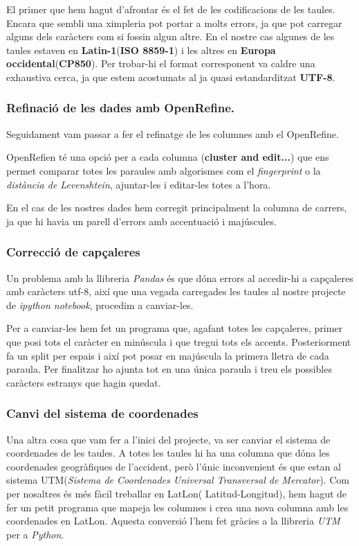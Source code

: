 El primer que hem hagut d'afrontar és el fet de les codificacions de les taules. Encara que sembli una ximpleria pot portar a molts errors, ja que pot carregar alguns dels caràcters com si fossin algun altre. En el nostre cas algunes de les taules estaven en \textbf{Latin-1}(\textbf{ISO 8859-1}) i les altres en \textbf{Europa occidental}(\textbf{CP850}). Per trobar-hi el format corresponent va caldre una exhaustiva cerca, ja que estem acostumats al ja quasi estandarditzat \textbf{ UTF-8}.

\subsubsection*{Refinació de les dades amb OpenRefine.}
Seguidament vam passar a fer el refinatge de les columnes amb el OpenRefine.

OpenRefien té una opció per a cada columna (\textbf{cluster and edit...}) que ens permet comparar totes les paraules amb algorismes com el \textit{fingerprint } o la \textit{distància de Levenshtein}, ajuntar-les i editar-les totes a l'hora.

En el cas de les nostres dades hem corregit principalment la columna de carrers, ja que hi havia un parell d'errors amb accentuació i majúscules.
\subsubsection*{Correcció de capçaleres}
Un problema amb la llibreria \textit{Pandas} és que dóna errors al accedir-hi a capçaleres amb caràcters utf-8, així que una vegada carregades les taules al nostre projecte de \textit{ipython notebook}, procedim a canviar-les.

Per a canviar-les hem fet un programa que, agafant totes les capçaleres, primer que posi tots el caràcter en minúscula i que tregui tots els accents. Posteriorment fa un split per espais i així pot posar en majúscula la primera lletra de cada paraula. Per finalitzar ho ajunta tot en una única paraula i treu els possibles caràcters estranys que hagin quedat.

\subsubsection*{Canvi del sistema de coordenades}

Una altra cosa que vam fer a l'inici del projecte, va ser canviar el sistema de coordenades de les taules.
A totes les taules hi ha una columna que dóna les coordenades geogràfiques de l'accident, però l'únic inconvenient és que estan al sistema UTM(\textit{Sistema de Coordenades Universal Transversal de Mercator}). Com per nosaltres és més fàcil treballar en LatLon( Latitud-Longitud), hem hagut de fer un petit programa que mapeja les columnes i crea una nova columna amb les coordenades en LatLon. Aquesta conversió l'hem fet gràcies a la llibreria \textit{UTM} per a \textit{Python}.

